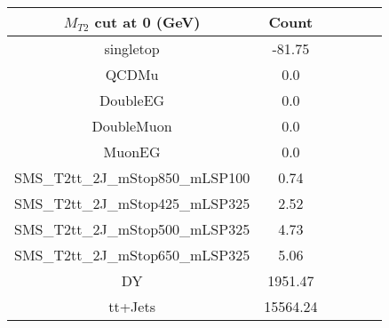 \documentclass[8pt]{article}
\begin{document}
\begin{tabular}{|c|c|c|c|c|c|}
\hline
$M_{T2}$ cut at 0 (GeV) & Count \\
\hline
\hline
singletop & -81.75\\
QCDMu & 0.0\\
DoubleEG & 0.0\\
DoubleMuon & 0.0\\
MuonEG & 0.0\\
SMS\_T2tt\_2J\_mStop850\_mLSP100 & 0.74\\
SMS\_T2tt\_2J\_mStop425\_mLSP325 & 2.52\\
SMS\_T2tt\_2J\_mStop500\_mLSP325 & 4.73\\
SMS\_T2tt\_2J\_mStop650\_mLSP325 & 5.06\\
DY & 1951.47\\
tt+Jets & 15564.24\\
\hline
\hline
\end{tabular}
\end{document}
